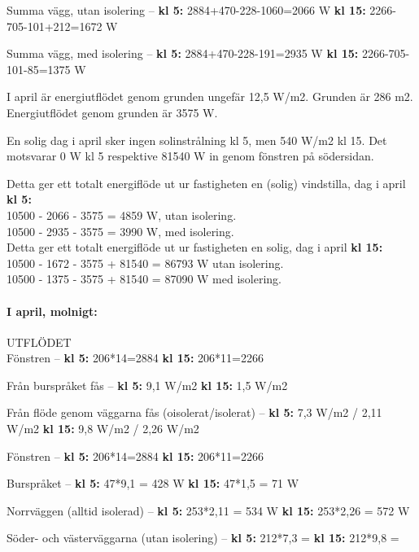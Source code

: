 Summa vägg, utan isolering –
\textbf{kl 5:} 2884+470-228-1060=2066 W
\textbf{kl 15:} 2266-705-101+212=1672 W

Summa vägg, med isolering –
\textbf{kl 5:} 2884+470-228-191=2935 W
\textbf{kl 15:} 2266-705-101-85=1375 W

I april är energiutflödet genom grunden ungefär 12,5 W/m2. Grunden är 286 m2.\\
Energiutflödet genom grunden är 3575 W.

En solig dag i april sker ingen solinstrålning kl 5, men 540 W/m2 kl 15. Det motsvarar 0 W kl 5 respektive 81540 W in genom fönstren på södersidan.

Detta ger ett totalt energiflöde ut ur fastigheten en (solig) vindstilla, dag i april \textbf{kl 5:}\\
10500 - 2066 - 3575 =  4859 W, utan isolering.\\
10500 - 2935 - 3575 =  3990 W, med isolering.\\

Detta ger ett totalt energiflöde ut ur fastigheten en solig, dag i april \textbf{kl 15:}\\
10500 - 1672 - 3575 + 81540 = 86793 W utan isolering.\\
10500 - 1375 - 3575 + 81540  =  87090 W med isolering.\\



\paragraph{I april, molnigt:}
UTFLÖDET\\

Fönstren –
\textbf{kl 5:} 206*14=2884
\textbf{kl 15:} 206*11=2266

Från burspråket fås –
\textbf{kl 5:} 9,1 W/m2
\textbf{kl 15:} 1,5 W/m2

Från flöde genom väggarna fås (oisolerat/isolerat) –
\textbf{kl 5:} 7,3 W/m2 / 2,11 W/m2
\textbf{kl 15:} 9,8 W/m2 / 2,26 W/m2


Fönstren –
\textbf{kl 5:} 206*14=2884
\textbf{kl 15:} 206*11=2266

Burspråket – 
\textbf{kl 5:} 47*9,1 = 428 W
\textbf{kl 15:} 47*1,5 = 71 W

Norrväggen (alltid isolerad) –
\textbf{kl 5:} 253*2,11 = 534 W
\textbf{kl 15:} 253*2,26 = 572 W

Söder- och västerväggarna (utan isolering) –
\textbf{kl 5:} 212*7,3 = 
\textbf{kl 15:} 212*9,8 = 

